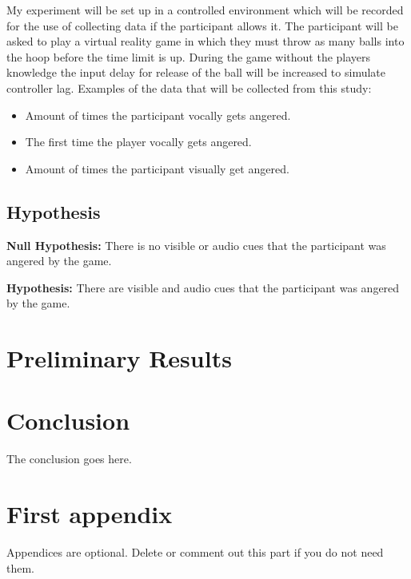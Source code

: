 \documentclass[journal]{IEEEtran}
\begin{document}
    My experiment will be set up in a controlled environment which will be recorded for the use of collecting data if the participant allows it. The participant will be asked to play a virtual reality game in which they must throw as many balls into the hoop before the time limit is up. During the game without the players knowledge the input delay for release of the ball will be increased to simulate controller lag. 
    Examples of the data that will be collected from this study:
    \begin{itemize}
	\item Amount of times the participant vocally gets angered.
	\item The first time the player vocally gets angered.
	\item Amount of times the participant visually get angered.
	
	
    \end{itemize}
    
    \subsection{Hypothesis}

\textbf{Null Hypothesis:}
    There is no visible or audio cues that the participant was angered by the game.
    
\textbf{Hypothesis:}
    There are visible and audio cues that the participant was angered by the game.
    
\textbf{}

\section{Preliminary Results}
\section{Conclusion}
The conclusion goes here.






\appendices
\section{First appendix}
Appendices are optional. Delete or comment out this part if you do not need them.

\end{document}
